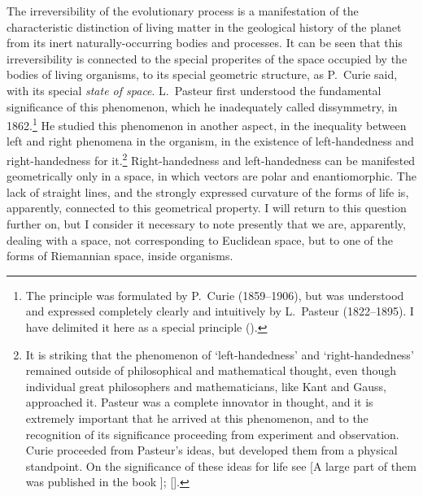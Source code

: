 \Section %
The irreversibility of the evolutionary process is a manifestation of the
characteristic distinction of living matter in the geological history of the
planet from its inert naturally-occurring bodies and processes.  It can be seen
that this irreversibility is connected to the special properites of the space
occupied by the bodies of living organisms, to its special geometric structure,
as P.~Curie said, with its special \emph{state of
space}.  L.~Pasteur first
understood the fundamental significance of this phenomenon, which he
inadequately called dissymmetry, in 1862.\footnote{
	The principle was formulated by P.~Curie (1859--1906), but was
	understood and expressed completely clearly and intuitively by
	L.~Pasteur (1822--1895).  I have delimited it here as a special
	principle (\cite{pasteur1922oeuvres, curie1908oeuvres}).
}  He studied this phenomenon in another aspect, in the inequality between
left and right phenomena in the organism, in the existence of left-handedness
and right-handedness for it.\footnote{
	It is striking that the phenomenon of `left-handedness' and
	`right-handedness' remained outside of philosophical and mathematical
	thought, even though individual great philosophers and mathematicians,
	like Kant and Gauss, approached it.  Pasteur was a complete innovator
	in thought, and it is extremely important that he arrived at this
	phenomenon, and to the recognition of its significance proceeding from
	experiment and observation.  Curie proceeded from Pasteur's ideas, but
	developed them from a physical standpoint.  On the significance of
	these ideas for life see \cite{vernadsky1940biogeohimicheskie} [A large
	part of them was published in the book
	\cite[22--271]{vernadsky1992trudy}]; \cite{vernadsky1934problemy1}
	[\cite{vernadsky1980problemy}].
}  Right-handedness and left-handedness can be manifested geometrically only in
a space, in which vectors are polar and enantiomorphic.  The lack of straight
lines, and the strongly expressed curvature of the forms of life is,
apparently, connected to this geometrical property.  I will return to this
question further on, but I consider it necessary to note presently that we are,
apparently, dealing with a space, not corresponding to Euclidean space, but to
one of the forms of Riemannian space, inside organisms.

